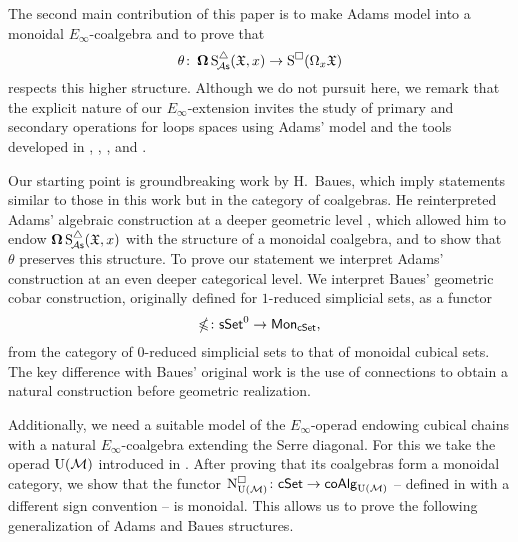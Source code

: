 The second main contribution of this paper is to make Adams model into a monoidal $E_\infty$-coalgebra and to prove that
\[
\theta \colon \operatorname{\mathbf{\Omega}} \operatorname{S^{\triangle}_{\!{\mathcal{A}\mathsf{s}}}}(\mathfrak{X}, x) \to \operatorname{S^{\square}}(\Omega_x \mathfrak{X})
\]
respects this higher structure.
Although we do not pursuit here, we remark that the explicit nature of our $E_\infty$-extension invites the study of primary and secondary operations for loops spaces using Adams' model and the tools developed in \cite{medina2021may_st}, \cite{medina2020cartan}, \cite{medina2021adem}, and \cite{medina2021comch}.

Our starting point is groundbreaking work by H.~Baues, which imply statements similar to those in this work but in the category of coalgebras.
He reinterpreted Adams' algebraic construction at a deeper geometric level \cite{baues1998hopf}, which allowed him to endow $\operatorname{\mathbf{\Omega}} \operatorname{S^{\triangle}_{\!{\mathcal{A}\mathsf{s}}}}(\mathfrak{X}, x)$ with the structure of a monoidal coalgebra, and to show that $\theta$ preserves this structure.
To prove our statement we interpret Adams' construction at an even deeper categorical level.
We interpret Baues' geometric cobar construction, originally defined for $1$-reduced simplicial sets, as a functor
\begin{equation*}
	\operatorname{\mathbb{\Omega}} \colon \mathsf{sSet}^0 \to \mathsf{Mon}_{\mathsf{cSet}},
\end{equation*}
from the category of $0$-reduced simplicial sets to that of monoidal cubical sets.
The key difference with Baues' original work is the use of connections to obtain a natural construction before geometric realization.

Additionally, we need a suitable model of the $E_\infty$-operad endowing cubical chains with a natural $E_\infty$-coalgebra extending the Serre diagonal.
For this we take the operad ${\operatorname{U}(\mathcal{M})}$ introduced in \cite{medina2020prop1}.
After proving that its coalgebras form a monoidal category, we show that the functor $\operatorname{N^{\square}_{{\operatorname{U}(\mathcal{M})}}} \colon \mathsf{cSet} \to \mathsf{coAlg}_{\operatorname{U}(\mathcal{M})}$ -- defined in \cite{medina2022cube_einfty} with a different sign convention -- is monoidal.
This allows us to prove the following generalization of Adams and Baues structures.


